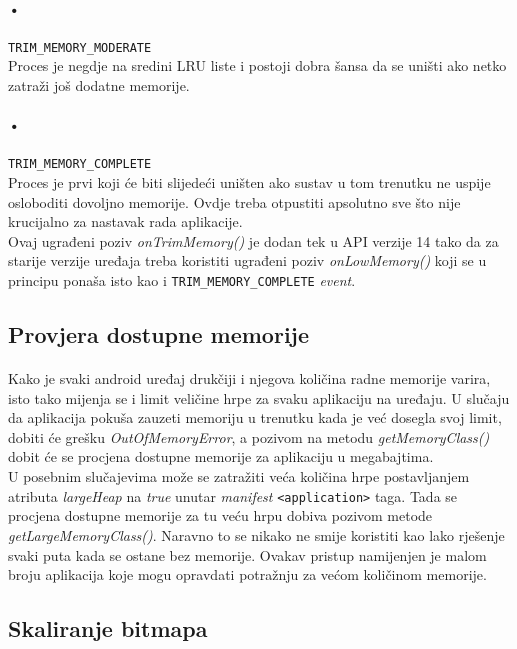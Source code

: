 \documentclass[times, utf8, zavrsni]{fer}
\begin{document}
\paragraph{•}
\verb|TRIM_MEMORY_MODERATE|\\
Proces je negdje na sredini LRU liste i postoji dobra šansa da se uništi ako netko zatraži još dodatne memorije.

\paragraph{•}
\verb|TRIM_MEMORY_COMPLETE|\\
Proces je prvi koji će biti slijedeći uništen ako sustav u tom trenutku ne uspije osloboditi dovoljno memorije. Ovdje treba otpustiti apsolutno sve što nije krucijalno za nastavak rada aplikacije.\\

Ovaj ugrađeni poziv \textit{onTrimMemory()} je dodan tek u API verzije 14 tako da za starije verzije uređaja treba koristiti ugrađeni poziv \textit{onLowMemory()} koji se u principu ponaša isto kao i \verb|TRIM_MEMORY_COMPLETE| \textit{event}.

\subsection{Provjera dostupne memorije}
\paragraph{}
Kako je svaki android uređaj drukčiji i njegova količina radne memorije varira, isto tako mijenja se i limit veličine hrpe za svaku aplikaciju na uređaju. U slučaju da aplikacija pokuša zauzeti memoriju u trenutku kada je već dosegla svoj limit, dobiti će grešku \textit{OutOfMemoryError}, a pozivom na metodu \textit{getMemoryClass()} dobit će se procjena dostupne memorije za aplikaciju u megabajtima.\\

U posebnim slučajevima može se zatražiti veća količina hrpe postavljanjem atributa \textit{largeHeap} na \textit{true} unutar \textit{manifest} \verb|<application>| taga. Tada se procjena dostupne memorije za tu veću hrpu dobiva pozivom metode \textit{getLargeMemoryClass()}. Naravno to se nikako ne smije koristiti kao lako rješenje svaki puta kada se ostane bez memorije. Ovakav pristup namijenjen je malom broju aplikacija koje mogu opravdati potražnju za većom količinom memorije.

\subsection{Skaliranje bitmapa}
\end{document}
